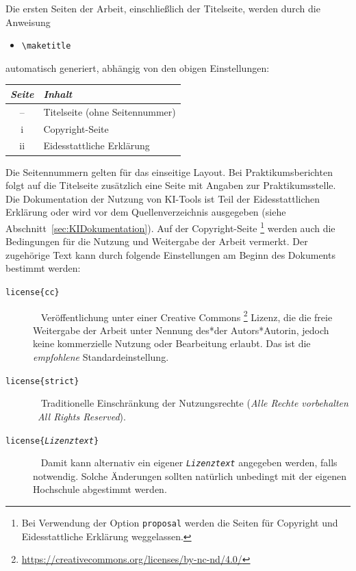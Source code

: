 Die ersten Seiten der Arbeit, einschließlich der Titelseite, werden durch die
Anweisung
%
\begin{itemize}
    \item[] \verb!\maketitle!
\end{itemize}
%
automatisch generiert, abhängig von den obigen Einstellungen:
%
\begin{center}
    \begin{tabular}{@{}cl@{}}
        \toprule
        \emph{Seite} & \emph{Inhalt} \\
        \midrule
        --           & Titelseite (ohne Seitennummer) \\
        \textrm{i}   & Copyright-Seite \\
        \textrm{ii}  & Eidesstattliche Erklärung \\
        \bottomrule
    \end{tabular}
\end{center}
%
Die Seitennummern gelten für das einseitige Layout. Bei Praktikumsberichten
folgt auf die Titelseite zusätzlich eine Seite mit Angaben zur
Praktikumsstelle. Die Dokumentation der Nutzung von KI-Tools ist Teil der
Eidesstattlichen Erklärung oder wird vor dem Quellenverzeichnis ausgegeben (siehe
Abschnitt~\ref{sec:KIDokumentation}).
Auf der Copyright-Seite%
\footnote{Bei Verwendung der Option \texttt{proposal} werden die Seiten für
Copyright und Eidesstattliche Erklärung weggelassen.}
werden auch die Bedingungen für die Nutzung und
Weitergabe der Arbeit vermerkt. Der zugehörige Text kann durch folgende
Einstellungen am Beginn des Dokuments bestimmt werden:
%
\begin{description}
    \item[\normalfont\texttt{{\bs}license\{cc\}}] ~ \newline
    Veröffentlichung unter einer Creative Commons%
    \footnote{\url{https://creativecommons.org/licenses/by-nc-nd/4.0/}}
    Lizenz, die die freie Weitergabe der Arbeit unter Nennung des*der
    Autors*Autorin, jedoch keine kommerzielle Nutzung oder Bearbeitung erlaubt.
    Das ist die \emph{empfohlene} Standardeinstellung.
    \item[\normalfont\texttt{{\bs}license\{strict\}}] ~ \newline
    Traditionelle Einschränkung der Nutzungsrechte
    (\emph{Alle Rechte vorbehalten} \bzw\ \emph{All Rights Reserved}).
    \item[\normalfont\texttt{{\bs}license\{\emph{Lizenztext}\}}] ~ \newline
    Damit kann alternativ ein eigener \texttt{\emph{Lizenztext}} angegeben
    werden, falls notwendig. Solche Änderungen sollten natürlich unbedingt
    mit der eigenen Hochschule abgestimmt werden.
\end{description}

